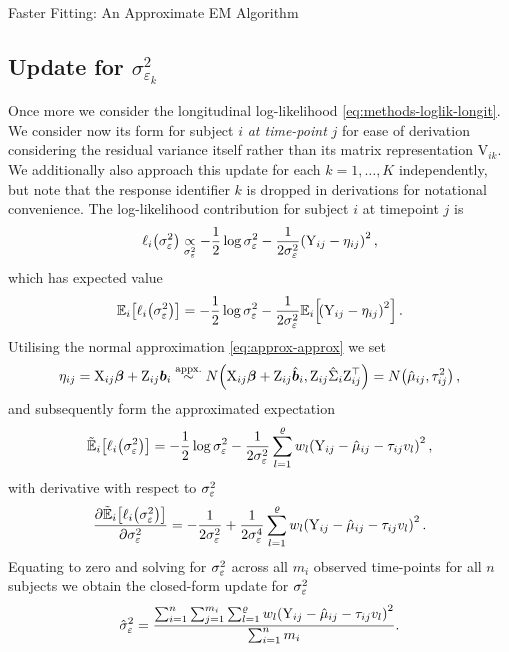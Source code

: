 \begin{chapter}{\label{cha:approx}Faster Fitting: An Approximate EM Algorithm}
  \subsection{Update for \texorpdfstring{$\sigma^2_{\varepsilon_k}$}{residvar}}\label{sec:approx-Mstep-sigma2}
  Once more we consider the longitudinal log-likelihood \eqref{eq:methods-loglik-longit}. We consider now its form for subject $i$ \textit{at time-point} $j$ for ease of derivation \ie considering the residual variance itself rather than its matrix representation $\mathrm{V}_{ik}$. We additionally also approach this update for each $k=1,\dots,K$ independently, but note that the response identifier $k$ is dropped in derivations for notational convenience. The log-likelihood contribution for subject $i$ at timepoint $j$ is
  \begin{align*}
      \ell_i\!\left(\sigma_\varepsilon^2\right)\underset{\sigma_\varepsilon^2}{\propto}-\frac{1}{2}\log\sigma_\varepsilon^2-\frac{1}{2\sigma_\varepsilon^2}\!\left(\mathrm{Y}_{ij}-\eta_{ij}\right)^2,
  \end{align*}
  which has expected value
  \begin{align*}
      \mathbb{E}_i\!\left[\ell_i\!\left(\sigma_\varepsilon^2\right)\right]=-\frac{1}{2}\log\sigma_\varepsilon^2-\frac{1}{2\sigma_\varepsilon^2}\mathbb{E}_i\!\left[\!\left(\mathrm{Y}_{ij}-\eta_{ij}\right)^2\right].
  \end{align*}
  Utilising the normal approximation \eqref{eq:approx-approx} we set
  \begin{align*}
      \eta_{ij}=\mathrm{X}_{ij}\bm{\beta}+\mathrm{Z}_{ij}\bm{b}_i\overset{\text{appx.}}{\sim} N\!\left(\mathrm{X}_{ij}\bm{\beta}+\mathrm{Z}_{ij}\hat{\bm{b}}_i,\mathrm{Z}_{ij}\hat{\Sigma}_i\mathrm{Z}_{ij}^\top\right)=N\!\left(\hat{\mu}_{ij},\tau^2_{ij}\right),
  \end{align*}
  and subsequently form the approximated expectation
  \begin{align*}
      \tilde{\mathbb{E}}_i\!\left[\ell_i\!\left(\sigma_\varepsilon^2\right)\right]=-\frac{1}{2}\log\sigma_\varepsilon^2-\frac{1}{2\sigma_\varepsilon^2}\sum_{l=1}^\varrho w_l\!\left(\mathrm{Y}_{ij}-\hat{\mu}_{ij}-\tau_{ij}v_l\right)^2,
  \end{align*}
  with derivative with respect to $\sigma_\varepsilon^2$
  \begin{align*}
      \frac{\partial\tilde{\mathbb{E}}_i\!\left[\ell_i\!\left(\sigma_\varepsilon^2\right)\right]}{\partial\sigma_\varepsilon^2}=-\frac{1}{2\sigma_\varepsilon^2}+\frac{1}{2\sigma^4_\varepsilon}\sum_{l=1}^\varrho w_l\!\left(\mathrm{Y}_{ij}-\hat{\mu}_{ij}-\tau_{ij}v_l\right)^2.
  \end{align*}
  Equating to zero and solving for $\sigma_\varepsilon^2$ across all $m_i$ observed time-points for all $n$ subjects we obtain the closed-form update for $\sigma_\varepsilon^2$
  \begin{align}
      \hat{\sigma}^2_\varepsilon=\frac{\sum_{i=1}^n\sum_{j=1}^{m_i}\sum_{l=1}^\varrho w_l\!\left(\mathrm{Y}_{ij}-\hat{\mu}_{ij}-\tau_{ij}v_l\right)^2}{\sum_{i=1}^n m_i}.
  \end{align}

\end{chapter}
